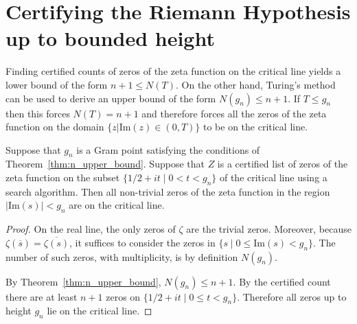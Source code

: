 \chapter{Certifying the Riemann Hypothesis up to bounded height}
\label{cha:rh_up_to}

Finding certified counts of zeros of the zeta function on the critical line 
yields a lower bound of the form $n + 1 \leq N(T)$.
On the other hand, Turing's method can be used to derive an upper bound 
of the form $N(g_n)\leq n + 1$. 
If $T \leq g_n$ then this forces $N(T) = n + 1$ and therefore forces 
all the zeros of the zeta function on the domain 
$\{z | \text{Im}(z) \in (0, T)\}$ to be on the critical line.

\begin{theorem}
\label{thm:rh_up_to}
\leanok
Suppose that $g_n$ is a Gram point satisfying the conditions of 
Theorem~\ref{thm:n_upper_bound}. Suppose that $Z$ is a certified 
list of zeros of the zeta function on the subset $\{1/2 + it\mid 0 < t < g_n\}$ 
of the critical line using a search algorithm. 
Then all non-trivial zeros of the zeta function in the region 
$|\text{Im}(s)| < g_n$ are on the critical line.
\end{theorem}

\begin{proof}
\leanok
{}
On the real line, the only zeros of $\zeta$ are the trivial zeros.
Moreover, because $\zeta(\overline{s}) = \overline{\zeta(s)}$, it suffices to 
consider the zeros in $\{s \mid 0 \leq \text{Im}(s) < g_n\}$.
The number of such zeros, with multiplicity, is by definition $N(g_n)$.

By Theorem~\ref{thm:n_upper_bound}, $N(g_n)\leq n + 1$. 
By the certified count there are at least $n + 1$ zeros on 
$\{1/2 + it \mid 0 \leq t < g_n\}$.
Therefore all zeros up to height $g_n$ lie on the critical line.
\end{proof}
